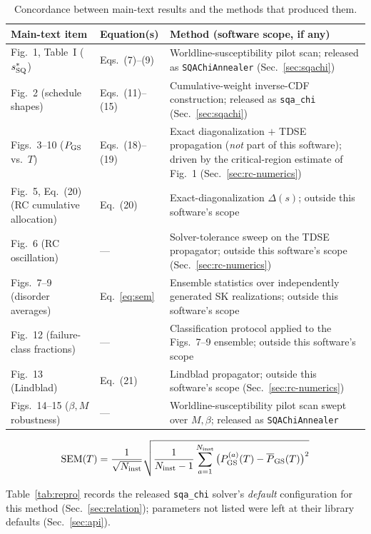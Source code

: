 \documentclass[11pt]{article}
\begin{document}
\begin{table}[h]
\centering
\small
\caption{Concordance between main-text results and the methods that produced them.}
\label{tab:concordance}
\begin{tabular}{p{3.3cm}p{3.6cm}p{6.3cm}}
\toprule
Main-text item & Equation(s) & Method (software scope, if any) \\
\midrule
Fig.~1, Table~I ($s^*_{\rm SQ}$) & Eqs.~(7)--(9) & Worldline-susceptibility pilot scan; released as \texttt{SQAChiAnnealer} (Sec.~\ref{sec:sqachi}) \\
Fig.~2 (schedule shapes) & Eqs.~(11)--(15) & Cumulative-weight inverse-CDF construction; released as \texttt{sqa\_chi} (Sec.~\ref{sec:sqachi}) \\
Figs.~3--10 ($P_{\rm GS}$ vs.\ $T$) & Eqs.~(18)--(19) & Exact diagonalization $+$ TDSE propagation (\emph{not} part of this software); driven by the critical-region estimate of Fig.~1 (Sec.~\ref{sec:rc-numerics}) \\
Fig.~5, Eq.~(20) (RC cumulative allocation) & Eq.~(20) & Exact-diagonalization $\Delta(s)$; outside this software's scope \\
Fig.~6 (RC oscillation) & --- & Solver-tolerance sweep on the TDSE propagator; outside this software's scope (Sec.~\ref{sec:rc-numerics}) \\
Figs.~7--9 (disorder averages) & Eq.~\eqref{eq:sem} & Ensemble statistics over independently generated SK realizations; outside this software's scope \\
Fig.~12 (failure-class fractions) & --- & Classification protocol applied to the Figs.~7--9 ensemble; outside this software's scope \\
Fig.~13 (Lindblad) & Eq.~(21) & Lindblad propagator; outside this software's scope (Sec.~\ref{sec:rc-numerics}) \\
Figs.~14--15 ($\beta,M$ robustness) & --- & Worldline-susceptibility pilot scan swept over $M,\beta$; released as \texttt{SQAChiAnnealer} \\
\bottomrule
\end{tabular}
\end{table}

\begin{equation}
{\rm SEM}(T) = \frac{1}{\sqrt{N_{\rm inst}}}
\sqrt{\frac{1}{N_{\rm inst}-1}\sum_{a=1}^{N_{\rm inst}}\big(P_{\rm GS}^{(a)}(T)-\overline P_{\rm GS}(T)\big)^2}
\label{eq:sem}
\end{equation}

Table~\ref{tab:repro} records the released \texttt{sqa\_chi} solver's \emph{default}
configuration for this method (Sec.~\ref{sec:relation}); parameters not listed were left at their
library defaults (Sec.~\ref{sec:api}).
\end{document}
